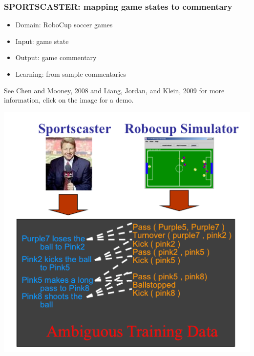 \documentclass[ignorenonframetext]{beamer}
\begin{document}
\begin{frame}
\begin{columns}[c]
\end{columns}
\end{frame}

\begin{frame}\frametitle{SPORTSCASTER: mapping game states to commentary}

\begin{itemize}
\item Domain: RoboCup soccer games
\item Input: game state
\item Output: game commentary
\item Learning: from sample commentaries
\end{itemize}

See \href{http://www.cs.utexas.edu/~ai-lab/pub-view.php?PubID=126770}{Chen and Mooney, 2008} 
and \href{http://cs.stanford.edu/~pliang/papers}{Liang, Jordan, and Klein, 2009}
for more information, click on the image for a demo.

\begin{center}
\href{http://www.cs.utexas.edu/users/ml/clamp/sportscasting}{
\includegraphics[height=.7\textheight]{images/chen-sportscast.png}}
\end{center}
\end{frame}
\end{document}
